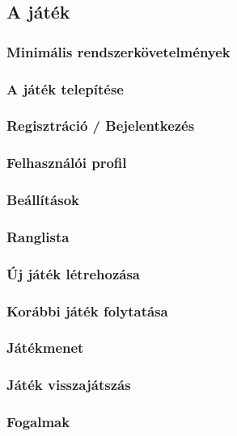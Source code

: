 \subsection{A játék}

\subsubsection{Minimális rendszerkövetelmények}
\subsubsection{A játék telepítése}
\subsubsection{Regisztráció / Bejelentkezés}
\subsubsection{Felhasználói profil}
\subsubsection{Beállítások}
\subsubsection{Ranglista}
\subsubsection{Új játék létrehozása}
\subsubsection{Korábbi játék folytatása}
\subsubsection{Játékmenet}
\subsubsection{Játék visszajátszás}
\subsubsection{Fogalmak}
